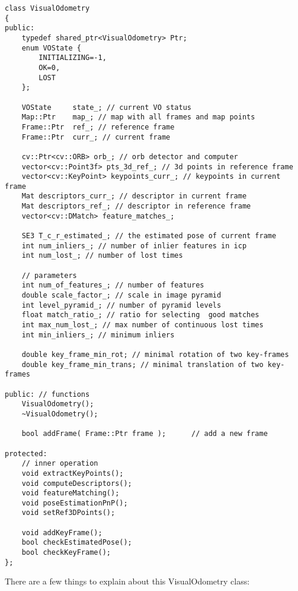 \begin{lstlisting}[language = c ++, caption = slambook/project/0.2/include/myslam/visual \_odometry.h]
class VisualOdometry
{
public:
	typedef shared_ptr<VisualOdometry> Ptr;
	enum VOState {
		INITIALIZING=-1,
		OK=0,
		LOST
	};

	VOState     state_; // current VO status
	Map::Ptr    map_; // map with all frames and map points
	Frame::Ptr  ref_; // reference frame 
	Frame::Ptr  curr_; // current frame 

	cv::Ptr<cv::ORB> orb_; // orb detector and computer 
	vector<cv::Point3f> pts_3d_ref_; // 3d points in reference frame 
	vector<cv::KeyPoint> keypoints_curr_; // keypoints in current frame
	Mat descriptors_curr_; // descriptor in current frame 
	Mat descriptors_ref_; // descriptor in reference frame 
	vector<cv::DMatch> feature_matches_;

	SE3 T_c_r_estimated_; // the estimated pose of current frame 
	int num_inliers_; // number of inlier features in icp
	int num_lost_; // number of lost times

	// parameters 
	int num_of_features_; // number of features
	double scale_factor_; // scale in image pyramid
	int level_pyramid_; // number of pyramid levels
	float match_ratio_; // ratio for selecting  good matches
	int max_num_lost_; // max number of continuous lost times
	int min_inliers_; // minimum inliers
	
	double key_frame_min_rot; // minimal rotation of two key-frames
	double key_frame_min_trans; // minimal translation of two key-frames

public: // functions 
	VisualOdometry();
	~VisualOdometry();

	bool addFrame( Frame::Ptr frame );      // add a new frame 

protected:  
	// inner operation 
	void extractKeyPoints();
	void computeDescriptors(); 
	void featureMatching();
	void poseEstimationPnP(); 
	void setRef3DPoints();
	
	void addKeyFrame();
	bool checkEstimatedPose(); 
	bool checkKeyFrame();
};
\end{lstlisting}

There are a few things to explain about this VisualOdometry class:

